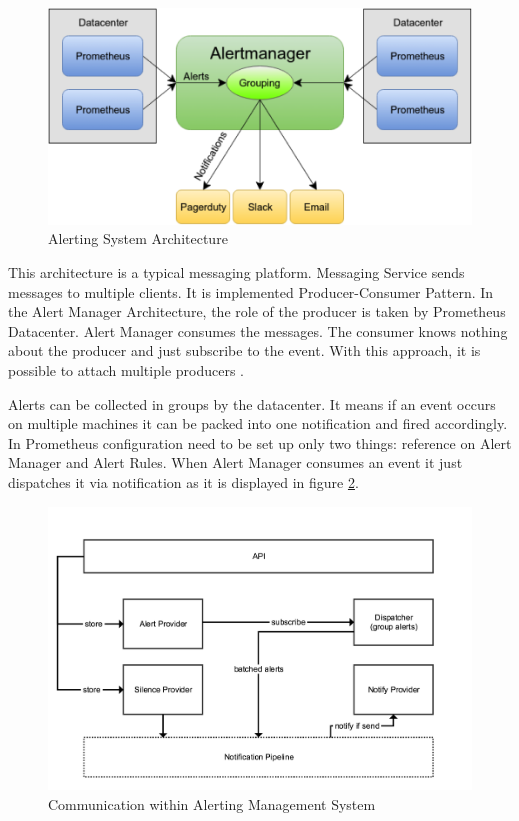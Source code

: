 \begin{figure}[htbp]
\begin{center}
  \includegraphics[scale=0.6]{components/3/alert_arch.png}
  \caption{Alerting System Architecture}
  \label{fig:alert_arch}
\end{center}
\end{figure}

This architecture is a typical messaging platform.
Messaging Service sends messages to multiple clients. It is implemented Producer-Consumer Pattern. In the Alert Manager Architecture, the role of the producer is taken by Prometheus Datacenter. Alert Manager consumes the messages. The consumer knows nothing about the producer and just subscribe to the event. With this approach, it is possible to attach multiple producers \cite{alert_book}. 

Alerts can be collected in groups by the datacenter. It means if an event occurs on multiple machines it can be packed into one notification and fired accordingly. 
In Prometheus configuration need to be set up only two things: reference on Alert Manager and Alert Rules. When Alert Manager consumes an event it just dispatches it via notification as it is displayed in figure \ref{fig:alert_arch_detailed}.

\begin{figure}[H]
\begin{center}
  \includegraphics[width=\linewidth]{components/3/alert_details.png}
  \caption{Communication within Alerting Management System}
  \label{fig:alert_arch_detailed}
\end{center}
\end{figure}

